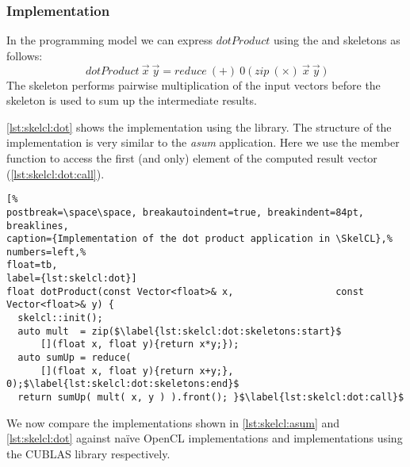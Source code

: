 \subsubsection*{\SkelCL Implementation}
In the \SkelCL programming model we can express $dotProduct$ using the \zip and \reduce skeletons as follows:
\begin{equation}
  dotProduct\ \vec{x}\ \vec{y} = reduce\ (+)\ 0\ \big(\ zip\ (\times)\ \vec{x}\ \vec{y}\ \big)
  \label{eq:skelcl:dot_product}
\end{equation}
The \zip skeleton performs pairwise multiplication of the input vectors before the \reduce skeleton is used to sum up the intermediate results.

\autoref{lst:skelcl:dot} shows the implementation using the \SkelCL library.
The structure of the implementation is very similar to the \emph{asum} application.
Here we use the  member function to access the first (and only) element of the computed result vector (\autoref{lst:skelcl:dot:call}).

\begin{lstlisting}[%                                                             
postbreak=\space\space, breakautoindent=true, breakindent=84pt, breaklines,
caption={Implementation of the dot product application in \SkelCL},%
numbers=left,%
float=tb,
label={lst:skelcl:dot}]
float dotProduct(const Vector<float>& x,                  const Vector<float>& y) {
  skelcl::init();
  auto mult  = zip($\label{lst:skelcl:dot:skeletons:start}$
      [](float x, float y){return x*y;});
  auto sumUp = reduce(
      [](float x, float y){return x+y;}, 0);$\label{lst:skelcl:dot:skeletons:end}$
  return sumUp( mult( x, y ) ).front(); }$\label{lst:skelcl:dot:call}$
\end{lstlisting}





\bigskip

We now compare the \SkelCL implementations shown in \autoref{lst:skelcl:asum} and \autoref{lst:skelcl:dot} against na{\"i}ve OpenCL implementations and implementations using the CUBLAS library respectively.


